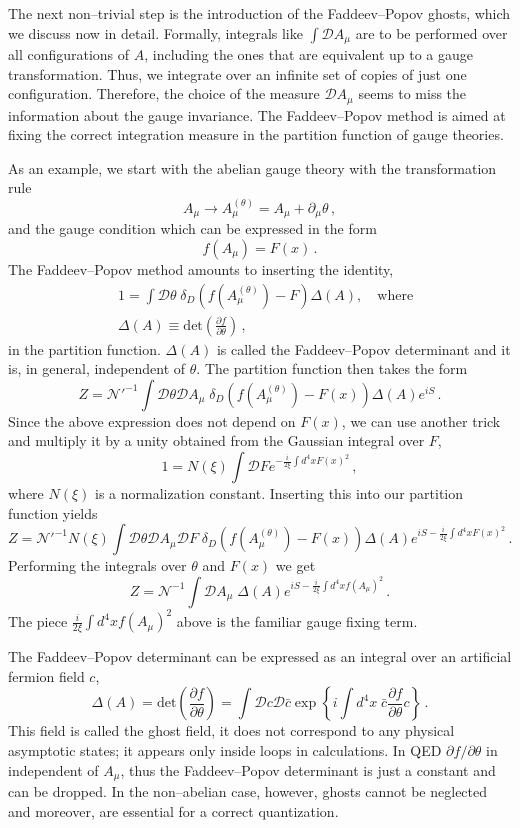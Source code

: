 \documentclass[12pt]{article}
\newcommand{\be}{\begin{equation}}
\newcommand{\ee}{\end{equation}}
\newcommand\m{\mu}
\newcommand\D{\Delta}
\renewcommand\t{\theta}
\def\d{\partial}
\renewcommand{\D}{\mathcal{D}}
\begin{document}
The next non--trivial step is the introduction of the Faddeev--Popov ghosts, which we discuss now in detail. Formally, integrals like $\int \D A_\m$ are to be performed over all configurations of $A$, including the ones that are equivalent
up to a gauge transformation. Thus, we integrate over an infinite set of
copies of just one configuration. Therefore, the choice of the measure $\D A_\m$
seems to miss the information about the gauge invariance.
The Faddeev--Popov method is aimed at fixing the correct integration measure in the
partition function of gauge theories.


As an example, we start with the abelian gauge theory with the transformation rule
\be
A_\mu \to A^{(\t)}_\mu=A_\mu+\d_\m \t\,,
\ee
and the gauge condition which can be expressed in the form
\be
f(A_\mu)=F(x)\,.
\ee
The Faddeev--Popov method amounts to inserting the identity,
\be
\begin{split}
& 1=\int \D \t\;\delta_D(f(A_\m^{(\t)})-F)\Delta (A),\quad \text{where}\\
& \Delta (A)\equiv \text{det}\left(\frac{\d f}{\d \t}\right)\,,
\end{split}
\ee
in the partition function. $\Delta (A)$ is called the Faddeev--Popov determinant
and it is, in general, independent of $\t$.
The partition function then takes the form
\be
Z=\mathcal{N}'^{-1}\int \D \t \D A_\m \;
\delta_D(f(A_\m^{(\t)})-F(x))\Delta (A)e^{iS}\,.
\ee
Since the above expression does not depend on $F(x)$,
we can use another trick and multiply it by a unity obtained from the Gaussian integral over $F$,
\be
1=N(\xi)\int \D F e^{-\frac{i}{2\xi}\int d^4x F(x)^2}\,,
\ee
where $N(\xi)$ is a normalization constant.
Inserting this into our partition function yields
\be
Z=\mathcal{N}'^{-1}N(\xi)\int \D \t \D A_\m  \D F\;
\delta_D(f(A_\m^{(\t)})-F(x))\Delta (A)e^{iS-\frac{i}{2\xi}\int d^4x F(x)^2}\,.
\ee
Performing the integrals over $\t$ and $F(x)$ we get
\be
Z=\mathcal{N}^{-1}\int\D A_\m \;\Delta (A)e^{iS-\frac{i}{2\xi}\int d^4x f(A_\mu)^2}\,.
\ee
The piece $\frac{i}{2\xi}\int d^4x f(A_\mu)^2$ above is the  familiar gauge fixing term.

The Faddeev--Popov determinant can be expressed as an integral over an artificial fermion field
$c$,
\be
\label{eq:ghosts}
 \Delta(A)=\text{det}\left(\frac{\d f}{\d \t}\right)=\int \D c\D \bar c
 \exp\left\{i\int d^4x\; \bar c \frac{\d f}{\d \t}c\right\}\,.
\ee
This field is called the ghost field, it does not correspond to any physical asymptotic states;
it appears only inside loops in calculations.
In QED $\d f/\d\theta$ in independent of $A_\mu$, thus the Faddeev--Popov determinant is
just a constant and can be dropped.
In the non--abelian case, however, ghosts cannot be neglected
and moreover, are essential for a correct quantization.
\end{document}
